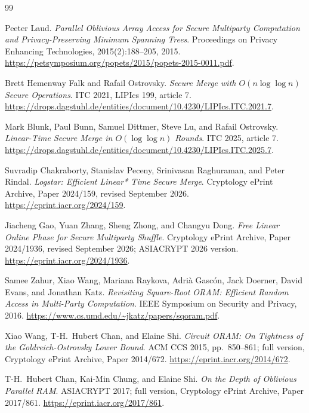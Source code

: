 \documentclass[11pt]{article}
\begin{document}
\clearpage
{}
{}
\begin{thebibliography}{99}
\raggedright

Peeter Laud.
\emph{Parallel Oblivious Array Access for Secure Multiparty Computation and Privacy-Preserving Minimum Spanning Trees}.
Proceedings on Privacy Enhancing Technologies, 2015(2):188--205, 2015.
\url{https://petsymposium.org/popets/2015/popets-2015-0011.pdf}.

Brett Hemenway Falk and Rafail Ostrovsky.
\emph{Secure Merge with $O(n\log\log n)$ Secure Operations}.
ITC 2021, LIPIcs 199, article 7.
\url{https://drops.dagstuhl.de/entities/document/10.4230/LIPIcs.ITC.2021.7}.

Mark Blunk, Paul Bunn, Samuel Dittmer, Steve Lu, and Rafail Ostrovsky.
\emph{Linear-Time Secure Merge in $O(\log\log n)$ Rounds}.
ITC 2025, article 7.
\url{https://drops.dagstuhl.de/entities/document/10.4230/LIPIcs.ITC.2025.7}.

Suvradip Chakraborty, Stanislav Peceny, Srinivasan Raghuraman, and Peter Rindal.
\emph{Logstar: Efficient Linear* Time Secure Merge}.
Cryptology ePrint Archive, Paper 2024/159, revised September 2026.
\url{https://eprint.iacr.org/2024/159}.

Jiacheng Gao, Yuan Zhang, Sheng Zhong, and Changyu Dong.
\emph{Free Linear Online Phase for Secure Multiparty Shuffle}.
Cryptology ePrint Archive, Paper 2024/1936, revised September 2026;
ASIACRYPT 2026 version.
\url{https://eprint.iacr.org/2024/1936}.

Samee Zahur, Xiao Wang, Mariana Raykova, Adri\`a Gasc\'on, Jack Doerner, David Evans, and Jonathan Katz.
\emph{Revisiting Square-Root ORAM: Efficient Random Access in Multi-Party Computation}.
IEEE Symposium on Security and Privacy, 2016.
\url{https://www.cs.umd.edu/~jkatz/papers/sqoram.pdf}.

Xiao Wang, T-H.~Hubert Chan, and Elaine Shi.
\emph{Circuit ORAM: On Tightness of the Goldreich-Ostrovsky Lower Bound}.
ACM CCS 2015, pp.~850--861; full version, Cryptology ePrint Archive, Paper 2014/672.
\url{https://eprint.iacr.org/2014/672}.

T-H.~Hubert Chan, Kai-Min Chung, and Elaine Shi.
\emph{On the Depth of Oblivious Parallel RAM}.
ASIACRYPT 2017; full version, Cryptology ePrint Archive, Paper 2017/861.
\url{https://eprint.iacr.org/2017/861}.


\end{thebibliography}
\end{document}
